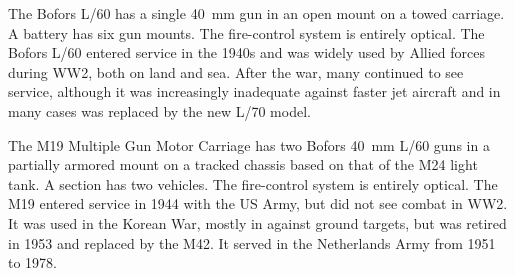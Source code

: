 \begin{withcounters}

    The Bofors L/60 has a single 40~mm gun in an open mount on a towed carriage. A
    battery has six gun mounts.
    The fire-control system is entirely optical.
    The Bofors L/60 entered service in the 1940s and was widely used by Allied forces during WW2, both on land and sea. After the war, many continued to see service, although it was increasingly inadequate against faster jet aircraft and in many cases was replaced by the new L/70 model.%


    The M19 Multiple Gun Motor Carriage has two Bofors 40~mm L/60 guns in a partially armored mount on a tracked chassis based on that of the M24 light tank.
    A section has two vehicles.
    The fire-control system is entirely optical.
    The M19 entered service in 1944 with the US Army, but did not see combat in WW2. It was used in the Korean War, mostly in against ground targets, but was retired in 1953 and replaced by the M42. It served in the Netherlands Army from 1951 to 1978.%


\end{withcounters}
